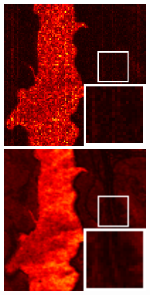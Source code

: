 \begin{figure}[t]
\begin{center}
\begin{minipage}{0.15\hsize}
		\end{minipage}
		\begin{minipage}{0.15\hsize}
			\centerline{\includegraphics[width=\hsize]{./fig_supplement/SAM_map_color_woboundary/JasperRidge/sam_map_TPTV.eps}} %
		\end{minipage}
		\begin{minipage}{0.15\hsize}
			\centerline{\includegraphics[width=\hsize]{./fig_supplement/SAM_map_color_woboundary/JasperRidge/sam_map_QRNN3D.eps}} %

\end{minipage}
\end{center}
\end{figure}
